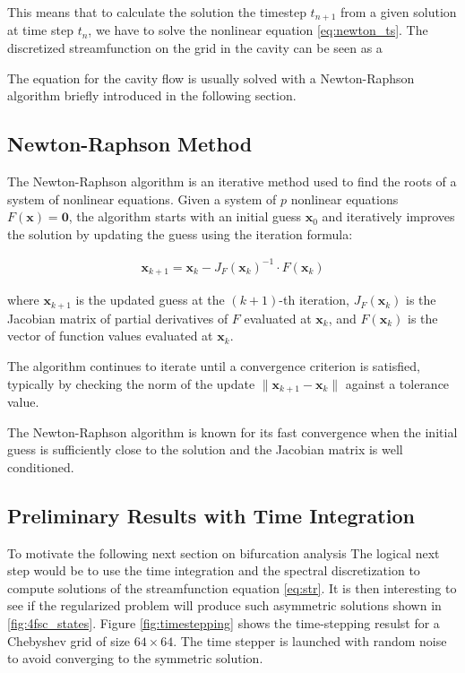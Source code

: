 This means that to calculate the solution the timestep $t_{n+1}$ from a given
solution at time step $t_n$, we have to solve the nonlinear equation
\eqref{eq:newton_ts}. The discretized streamfunction on the grid in the cavity
can be seen as a

The equation for the cavity flow is usually solved with a Newton-Raphson
algorithm \citep{kuhlmann2019} briefly introduced in the following section. 

\subsection{Newton-Raphson Method}

The Newton-Raphson algorithm is an iterative method used to find the roots of a
system of nonlinear equations. Given a system of $p$ nonlinear equations
$F(\mathbf{x}) = \mathbf{0}$, the algorithm starts with an initial guess
$\mathbf{x}_0$ and iteratively improves the solution by updating the guess
using the iteration formula:

\begin{align} \mathbf{x}_{k+1} = \mathbf{x}_k - J_F(\mathbf{x}_k)^{-1} \cdot
F(\mathbf{x}_k) \end{align}

where $\mathbf{x}_{k+1}$ is the updated guess at the $(k+1)$-th iteration,
$J_F(\mathbf{x}_k)$ is the Jacobian matrix of partial derivatives of $F$
evaluated at $\mathbf{x}_k$, and $F(\mathbf{x}_k)$ is the vector of function
values evaluated at $\mathbf{x}_k$.

The algorithm continues to iterate until a convergence criterion is satisfied,
typically by checking the norm of the update $\|\mathbf{x}_{k+1} -
\mathbf{x}_k\|$ against a tolerance value.

The Newton-Raphson algorithm is known for its fast convergence when the initial
guess is sufficiently close to the solution and the Jacobian matrix is well
conditioned.

\subsection{Preliminary Results with Time Integration}

To motivate the following next section on bifurcation analysis The logical next
step would be to use the time integration and the spectral discretization to
compute solutions of the streamfunction equation \eqref{eq:str}. It is then
interesting to see if the regularized problem will produce such asymmetric
solutions shown in \ref{fig:4fsc_states}. Figure \ref{fig:timestepping} shows
the time-stepping resulst for a Chebyshev grid of size $64 \times 64$. The time
stepper is launched with random noise to avoid converging to the symmetric
solution.

